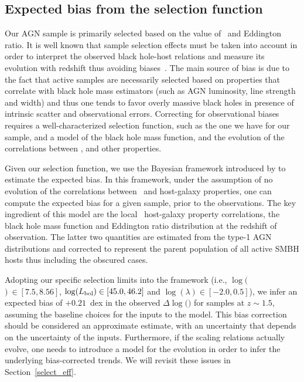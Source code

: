 \documentclass[apj]{emulateapj}
\begin{document}
\subsection{Expected bias from the selection function}

\label{sec:sf_framework}

Our AGN sample is primarily selected based on the value of \mbh~and Eddington ratio. It is well known that sample selection effects must be taken into account in order to  interpret the observed black hole-host relations and measure its evolution with redshift thus avoiding biases~\citep{Tre++07,Schulze2011,Bennert++2011, Schulze2014,Park15}. The main source of bias is due to the fact that active samples are necessarily selected based on properties that correlate with black hole mass estimators (such as AGN luminosity, line strength and width) and thus one tends to favor overly massive black holes in presence of intrinsic scatter and observational errors. Correcting for observational biases requires a well-characterized selection function, such as the one we have for our sample, and a model of the black hole mass function, and the evolution of the correlations between \mbh, and other properties.

Given our selection function, we use the Bayesian framework introduced by \citet{Schulze2011,Schulze2014} to estimate the expected bias. In this framework, under the assumption of no evolution of the correlations between \mbh\ and host-galaxy properties, one can compute the expected bias for a given sample, prior to the observations. The key ingredient of this model are the local \mbh\ host-galaxy property correlations, the black hole mass function and Eddington ratio distribution at the redshift of observation. The latter two quantities are estimated from the type-1 AGN distributions \citep{Schulze2015} and corrected to represent the parent population of all active SMBH hosts thus including the obscured cases. 

Adopting our specific selection limits into the framework (i.e., $\log($\mbh$)~\in[7.5, 8.56]$, $\log(L_{\rm bol}) \in [45.0, 46.2] $ and  $\log(\lambda) \in [-2.0, 0.5]$), we infer an expected bias of $+0.21$~dex in the observed $\Delta\log($\mbh$)$ for samples at $z\sim1.5$, assuming the baseline choices for the inputs to the model. This bias correction should be considered an approximate estimate, with an uncertainty that depends on the uncertainty of the inputs. Furthermore, if the scaling relations actually evolve, one needs to introduce a model for the evolution in order to infer the underlying bias-corrected trends. We will revisit these issues in Section~\ref{select_eff}.
\end{document}
